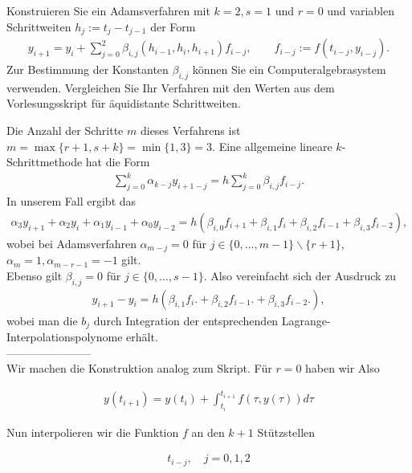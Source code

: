 \begin{exercise}
Konstruieren Sie ein Adamsverfahren mit $k = 2, s = 1$ und $r = 0$ und variablen
Schrittweiten $h_j := t_j - t_{j-1}$ der Form
\begin{align}
  y_{i+1} = y_i + \sum_{j=0}^2 \beta_{i,j}(h_{i-1},h_i,h_{i+1})f_{i-j},
  \qquad f_{i-j} := f(t_{i-j},y_{i-j}).
\end{align}
Zur Bestimmung der Konstanten $\beta_{i,j}$ können Sie ein Computeralgebrasystem
verwenden. Vergleichen Sie Ihr Verfahren mit den Werten aus dem Vorlesungsskript
für äquidistante Schrittweiten.
\end{exercise}
\begin{solution}
Die Anzahl der Schritte $m$ dieses Verfahrens ist $m = \max\{r+1,s+k\}=\min\{1,3\} = 3$.
Eine allgemeine lineare $k$-Schrittmethode hat die Form
\begin{align*}
  \sum_{j = 0}^k \alpha_{k - j}y_{i+1-j} = h \sum_{j = 0}^k \beta_{i,j}f_{i-j}.
\end{align*}
In unserem Fall ergibt das
\begin{align*}
  \alpha_3 y_{i + 1} + \alpha_2 y_{i} + \alpha_1 y_{i - 1} + \alpha_0 y_{i - 2} =
  h \left(\beta_{i,0} f_{i+1} +
  \beta_{i,1} f_{i} +
  \beta_{i,2} f_{i-1} +
  \beta_{i,3} f_{i-2}\right),
\end{align*}
wobei bei Adamsverfahren $\alpha_{m-j} = 0$ für $j \in \{0,\dots,m-1\}\backslash\{r+1\}$,
$\alpha_m = 1, \alpha_{m-r-1} = -1$ gilt. \\
Ebenso gilt $\beta_{i,j} = 0$ für $j \in \{0,\dots,s-1\}$.
Also vereinfacht sich der Ausdruck zu
\begin{align*}
y_{i + 1} - y_{i} =
h \left(
\beta_{i,1} f_{i}. +
\beta_{i,2} f_{i-1}. +
\beta_{i,3} f_{i-2}.\right),
\end{align*}
wobei man die $b_j$ durch Integration der entsprechenden Lagrange-Interpolationspolynome erhält. \\

----------------------- \\

Wir machen die Konstruktion analog zum Skript. Für $r=0$ haben wir Also

\begin{align*}
  y(t_{i+1}) = y(t_i) + \int_{t_i}^{t_{i+1}} f(\tau, y(\tau))d\tau
\end{align*}

Nun interpolieren wir die Funktion $f$ an den $k+1$ Stützstellen

\begin{align*}
  t_{i-j}, \quad j=0,1,2
\end{align*}


\end{solution}
